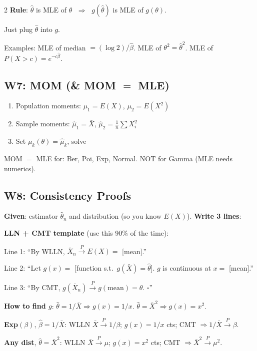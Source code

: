 \documentclass[8pt]{extarticle}
\begin{document}
\begin{multicols}{2}
\textbf{Rule}: $\hat\theta$ is MLE of $\theta$ $\;\Rightarrow\;$ $g(\hat\theta)$ is MLE of $g(\theta)$.

Just plug $\hat\theta$ into $g$.

Examples: MLE of median $= ({\log 2})/{\hat\beta}$. \; MLE of $\theta^2 = \hat\theta^2$. \; MLE of $P(X>c) = e^{-c\hat\beta}$.

\subsection{W7: MOM (\& MOM $=$ MLE)}

\begin{enumerate}
\item Population moments: $\mu_1 = E(X)$, $\mu_2 = E(X^2)$
\item Sample moments: $\hat\mu_1 = \bar X$, $\hat\mu_2 = \frac{1}{n}\sum X_i^2$
\item Set $\mu_k(\theta) = \hat\mu_k$, solve
\end{enumerate}

MOM $=$ MLE for: Ber, Poi, Exp, Normal. NOT for Gamma (MLE needs numerics).

\subsection{W8: Consistency Proofs}

\textbf{Given}: estimator $\hat\theta_n$ and distribution (so you know $E(X)$). \textbf{Write 3 lines}:

\textbf{LLN + CMT template} (use this 90\% of the time):

Line 1: ``By WLLN, $\bar X_n \xrightarrow{P} E(X) = $ [mean].''

Line 2: ``Let $g(x) = $ [function s.t.\ $g(\bar X) = \hat\theta$]. $g$ is continuous at $x=$ [mean].''

Line 3: ``By CMT, $g(\bar X_n) \xrightarrow{P} g(\text{mean}) = \theta$. $\square$''

\textbf{How to find $g$}: $\hat\theta = 1/\bar X \Rightarrow g(x)=1/x$. \; $\hat\theta = \bar X^2 \Rightarrow g(x)=x^2$.

\medskip

\textbf{Exp}$(\beta)$, $\hat\beta=1/\bar X$: WLLN $\bar X\xrightarrow{P}1/\beta$; $g(x)=1/x$ cts; CMT $\Rightarrow 1/\bar X\xrightarrow{P}\beta$.

\textbf{Any dist}, $\hat\theta=\bar X^2$: WLLN $\bar X\xrightarrow{P}\mu$; $g(x)=x^2$ cts; CMT $\Rightarrow \bar X^2\xrightarrow{P}\mu^2$.


\end{multicols}
\end{document}
